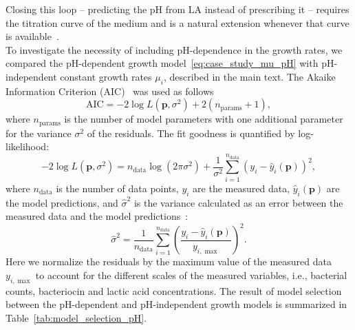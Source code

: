 \documentclass[10pt,1p,authoryear]{elsarticle}
\numberwithin{equation}{section}
\begin{document}
Closing this loop -- predicting the pH from $\mathrm{LA}$ instead of prescribing it -- requires the titration curve of the medium and is a natural extension whenever that curve is available~\citep{breidt2022buffer, anthony2025synthetic}.\\
%
To investigate the necessity of including pH-dependence in the growth rates, we compared the pH-dependent growth model~\eqref{eq:case_study_mu_pH} with pH-independent constant growth rates $\mu_i$, described in the main text.
The Akaike Information Criterion (AIC)~\citep{akaike1100705} was used as follows
\begin{equation}
\mathrm{AIC} = -2\log L(\mathbf{p},\sigma^2) + 2(n_\text{params}+1),
\label{eq:AIC}
\end{equation}
where $n_\text{params}$ is the number of model parameters with one additional parameter for the variance $\sigma^2$ of the residuals.
The fit goodness is quantified by log-likelihood:
\begin{equation}
    -2 \log L(\mathbf{p},\sigma^2) = n_{\text{data}}\log(2\pi\sigma^2) + \frac{1}{\sigma^2}\sum_{i=1}^{n_{\text{data}}} \left(y_i - \hat y_i(\mathbf{p})\right)^2,
\label{eq:supplement_akaike_logL}
\end{equation}
where $n_{\text{data}}$ is the number of data points, $y_i$ are the measured data, $\hat y_i(\mathbf{p})$ are the model predictions, and $\hat\sigma^2$ is the variance calculated as an error between the measured data and the model predictions~\citep{murphy_implementing_2023, simpson_profile-wise_2023}:
\begin{equation}
    \hat\sigma^2 = \frac{1}{n_{\text{data}}}\sum_{i=1}^{n_{\text{data}}} \left(\frac{y_i - \hat y_i(\mathbf{p})}{y_{i,\max}}\right)^2.
\label{eq:sigma_mle_normalized}
\end{equation}
Here we normalize the residuals by the maximum value of the measured data $y_{i,\max}$ to account for the different scales of the measured variables, i.e., bacterial counts, bacteriocin and lactic acid concentrations.
%
The result of model selection between the pH-dependent and pH-independent growth models is summarized in Table~\ref{tab:model_selection_pH}.
\end{document}
